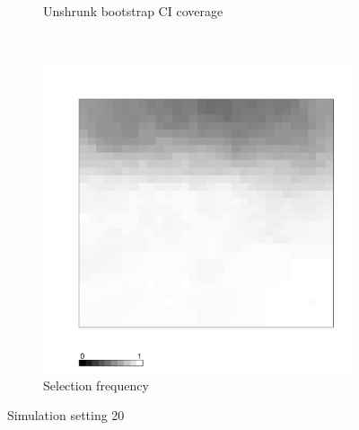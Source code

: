 \documentclass[authoryear, review, 11pt]{elsarticle}
\begin{document}
\begin{figure}
\begin{subfigure}[b]{0.45\textwidth}
		\caption{Unshrunk bootstrap CI coverage}
	\end{subfigure}%
	~ %
	\begin{subfigure}[b]{0.45\textwidth}
	\centering
		\includegraphics[width=\textwidth]{../../figures/simulation/X1.15.20.selection.pdf}
		\caption{Selection frequency}
	\end{subfigure}
	\caption{Simulation setting 20}
\end{figure}
\end{document}
